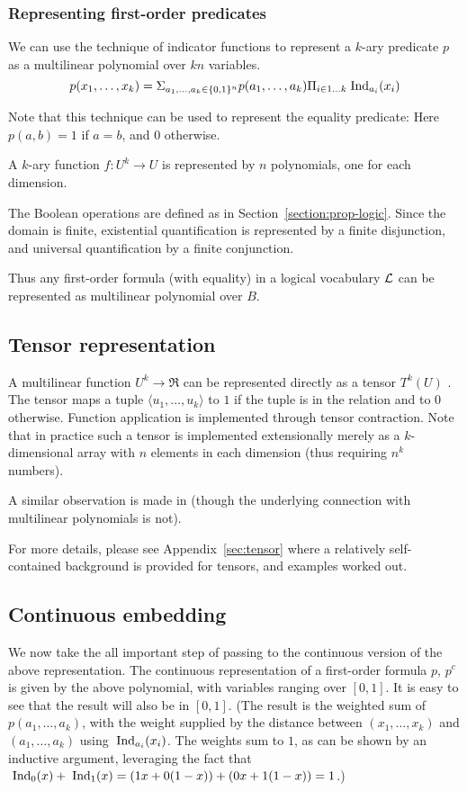 \documentclass{article} %
\newcommand{\tuple}[1]{\(\langle #1\rangle\)}
\begin{document}
\subsubsection{Representing first-order predicates}
We can use the technique of indicator functions to represent a $k$-ary predicate $p$ as a multilinear polynomial over $kn$ variables. 
$$p(x_1,\ldots, x_k)= \Sigma_{a_1,\ldots,a_k \in \{0,1\}^n} p(a_1, \ldots, a_k)  \Pi_{i \in 1\ldots k} \;\mbox{Ind}_{a_i}(x_i)$$

\noindent Note that this technique can be used to represent the equality predicate: Here $p(a,b)=1$ if $a=b$, and $0$ otherwise.

A $k$-ary function $f:U^k \rightarrow U$ is represented by $n$ polynomials, one for each dimension.

The Boolean operations are defined as in Section~\ref{section:prop-logic}. Since the domain is finite, existential quantification is represented by a finite disjunction, and universal quantification by a finite conjunction. 

Thus any first-order formula (with equality) in a logical vocabulary \({\cal L}\) can be represented as multilinear polynomial over \(B\). 

\subsection{Tensor representation}
A multilinear function $U^k \rightarrow \Re$ can be represented directly as a tensor $T^k(U)$ \cite[Chapter 8]{lee-book-2000}. The tensor maps a tuple \tuple{u_1,\ldots, u_k} to $1$ if the tuple is in the relation and to $0$ otherwise. Function application is implemented through tensor contraction. Note that in practice such a tensor is implemented extensionally merely as a \(k\)-dimensional array with \(n\) elements in each dimension (thus requiring \(n^k\) numbers). 

A similar observation is made in \cite{grefenstette-2013} (though the underlying connection with multilinear polynomials is not).

For more details, please see Appendix~\ref{sec:tensor} where a relatively self-contained background is provided for tensors, and examples worked out. 

\subsection{Continuous embedding}
We now take the all important step of passing to the continuous version of the above representation. 
The continuous representation of a first-order formula $p$, $p^c$ is given by the above polynomial, with
variables ranging over $[0,1]$. It is easy to see that the result will also be in $[0,1]$. (The result is the weighted sum of $p(a_1, \ldots, 
  a_k)$, with the weight supplied by the distance between $(x_1,
  \ldots, x_k)$ and $(a_1, \ldots, a_k)$ using $\;\mbox{Ind}_{a_i}(x_i)$. The
  weights sum to $1$, as can be shown by an inductive argument,
  leveraging the fact that $\;\mbox{Ind}_{0}(x) + \;\mbox{Ind}_{1}(x)=(1x+0(1-x))+(0x+1(1-x))=1$.)
\end{document}
